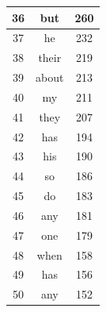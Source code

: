 \documentclass[12pt]{Report}
\begin{document}
\begin{table}
\begin{center}
\begin{tabular}{ c | c | c }
36 & but &  260 \\ \hline
37 & he & 232 \\ \hline
38 & their & 219 \\ \hline
39 & about & 213 \\ \hline
40 & my & 211 \\ \hline
41 & they & 207 \\ \hline
42 & has & 194 \\ \hline
43 & his & 190 \\ \hline
44 & so & 186 \\ \hline
45 & do & 183 \\ \hline
46 & any & 181 \\ \hline
47 & one& 179 \\ \hline
48 & when & 158 \\ \hline
49 & has & 156 \\ \hline
50 & any &  152 \\ \hline
    \hline
  \end{tabular}
  \label{table:textFiles}
\end{center}
\end{table} 
\end{document}
